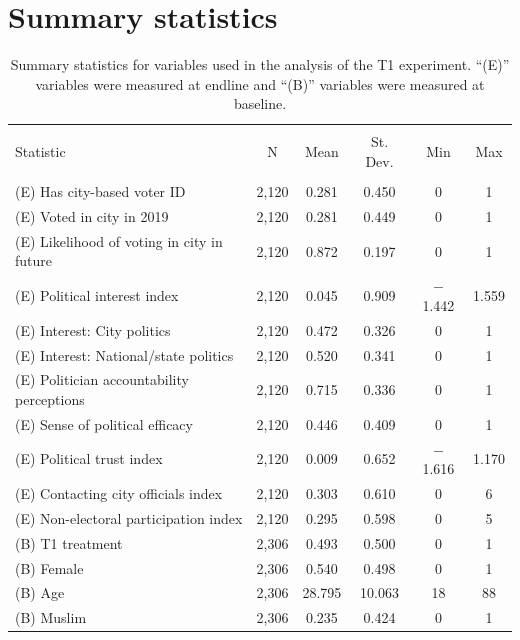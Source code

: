 \documentclass[
  11.5pt,
]{article}
\begin{document}
\clearpage

\section{Summary statistics}

\begin{table}[!htbp] \centering 
  \caption{Summary statistics for variables used in the analysis of the T1 experiment. ``(E)'' variables were measured at endline and ``(B)'' variables were measured at baseline.} 
  \label{} 
\fontsize{10pt}{10pt}\selectfont
\begin{tabular}{@{\extracolsep{5pt}}lccccc} 
\\[-1.8ex]\hline 
\hline \\[-1.8ex] 
Statistic & \multicolumn{1}{c}{N} & \multicolumn{1}{c}{Mean} & \multicolumn{1}{c}{St. Dev.} & \multicolumn{1}{c}{Min} & \multicolumn{1}{c}{Max} \\ 
\hline \\[-1.8ex] 
(E) Has city-based voter ID & 2,120 & 0.281 & 0.450 & 0 & 1 \\ 
(E) Voted in city in 2019 & 2,120 & 0.281 & 0.449 & 0 & 1 \\ 
(E) Likelihood of voting in city in future & 2,120 & 0.872 & 0.197 & 0 & 1 \\ 
(E) Political interest index & 2,120 & 0.045 & 0.909 & $-$1.442 & 1.559 \\ 
(E) Interest: City politics & 2,120 & 0.472 & 0.326 & 0 & 1 \\ 
(E) Interest: National/state politics & 2,120 & 0.520 & 0.341 & 0 & 1 \\ 
(E) Politician accountability perceptions & 2,120 & 0.715 & 0.336 & 0 & 1 \\ 
(E) Sense of political efficacy & 2,120 & 0.446 & 0.409 & 0 & 1 \\ 
(E) Political trust index & 2,120 & 0.009 & 0.652 & $-$1.616 & 1.170 \\ 
(E) Contacting city officials index & 2,120 & 0.303 & 0.610 & 0 & 6 \\ 
(E) Non-electoral participation index & 2,120 & 0.295 & 0.598 & 0 & 5 \\ 
(B) T1 treatment & 2,306 & 0.493 & 0.500 & 0 & 1 \\ 
(B) Female & 2,306 & 0.540 & 0.498 & 0 & 1 \\ 
(B) Age & 2,306 & 28.795 & 10.063 & 18 & 88 \\ 
(B) Muslim & 2,306 & 0.235 & 0.424 & 0 & 1 \\ 

\end{tabular}
\end{table}
\end{document}
